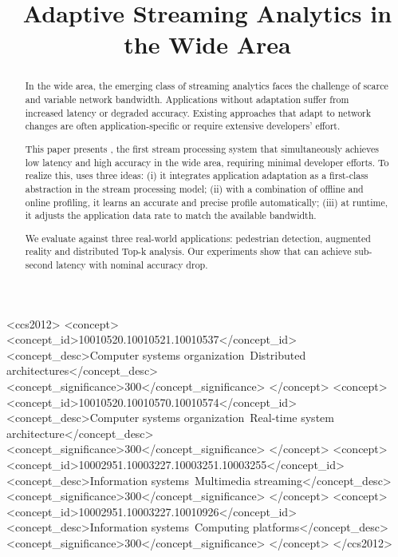 \documentclass[10pt, sigplan, anonymous, review]{acmart}
\begin{document}
\title{Adaptive Streaming Analytics in the Wide Area}

\renewcommand{\shortauthors}{B. Zhang et al.}



\begin{abstract}
  In the wide area, the emerging class of streaming analytics faces the
  challenge of scarce and variable network bandwidth. Applications without
  adaptation suffer from increased latency or degraded accuracy. Existing
  approaches that adapt to network changes are often application-specific or
  require extensive developers' effort.

  This paper presents \sysname{}, the first stream processing system that
  simultaneously achieves low latency and high accuracy in the wide area,
  requiring minimal developer efforts. To realize this, \sysname{} uses three
  ideas: (i) it integrates application adaptation as a first-class abstraction
  in the stream processing model; (ii) with a combination of offline and online
  profiling, it learns an accurate and precise profile automatically; (iii) at
  runtime, it adjusts the application data rate to match the available
  bandwidth.

  We evaluate \sysname{} against three real-world applications: pedestrian
  detection, augmented reality and distributed Top-k analysis. Our experiments
  show that \sysname{} can achieve sub-second latency with nominal accuracy
  drop.
\end{abstract}

%
\begin{CCSXML}
<ccs2012>
  <concept>
    <concept_id>10010520.10010521.10010537</concept_id>
    <concept_desc>Computer systems organization~Distributed architectures</concept_desc>
    <concept_significance>300</concept_significance>
  </concept>
  <concept>
    <concept_id>10010520.10010570.10010574</concept_id>
    <concept_desc>Computer systems organization~Real-time system architecture</concept_desc>
    <concept_significance>300</concept_significance>
  </concept>
  <concept>
    <concept_id>10002951.10003227.10003251.10003255</concept_id>
    <concept_desc>Information systems~Multimedia streaming</concept_desc>
    <concept_significance>300</concept_significance>
  </concept>
  <concept>
    <concept_id>10002951.10003227.10010926</concept_id>
    <concept_desc>Information systems~Computing platforms</concept_desc>
    <concept_significance>300</concept_significance>
  </concept>
</ccs2012>
\end{CCSXML}
\end{document}

